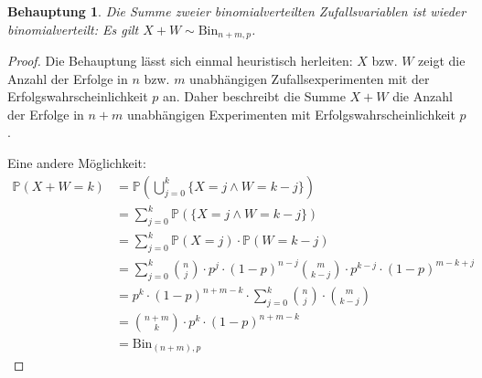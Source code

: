 \documentclass[a4paper]{scrartcl}
\newtheorem*{behaupt}{Behauptung}
\newcommand{\prob}{\mathbb{P}}
\begin{document}
\begin{enumerate}[label=\bfseries 1.\arabic*]
\begin{enumerate}[label=\alph*)]
                \begin{behaupt}
                    Die Summe zweier binomialverteilten Zufallsvariablen ist
                    wieder binomialverteilt:
                    Es gilt $X + W \sim \text{Bin}_{n+m,p}$.
                \end{behaupt}
                \begin{proof}
                    Die Behauptung lässt sich einmal heuristisch herleiten: $X$
                    bzw. $W$ zeigt die Anzahl der Erfolge in $n$ bzw. $m$
                    unabhängigen Zufallsexperimenten mit der
                    Erfolgswahrscheinlichkeit $p$ an. Daher beschreibt die
                    Summe $X + W$ die Anzahl der Erfolge in $n+m$ unabhängigen
                    Experimenten mit Erfolgswahrscheinlichkeit $p$.

                    Eine andere Möglichkeit:
                    \begin{equation*}
                        \begin{split}
                            \prob(X+W=k)
                            &= \prob \left( \bigcup_{j=0}^k \{X=j \land W=k-j\}
                            \right) \\
                            &= \sum_{j=0}^k \prob (\{X=j \land W=k-j\}) \\
                            &= \sum_{j=0}^k \prob (X=j) \cdot \prob(W=k-j) \\
                            &= \sum_{j=0}^k
                            \binom{n}{j} \cdot p^j \cdot (1-p)^{n-j}
                            \binom{m}{k-j} \cdot p^{k-j} \cdot (1-p)^{m-k+j} \\
                            &= p^k \cdot (1-p)^{n+m-k} \cdot
                            \sum_{j=0}^k \binom{n}{j} \cdot \binom{m}{k-j} \\
                            &= \binom{n+m}{k} \cdot p^k \cdot (1-p)^{n+m-k} \\
                            &= \text{Bin}_{(n+m),p}
                        \end{split}
                    \end{equation*}
                \end{proof}


\end{enumerate}
\end{enumerate}
\end{document}
